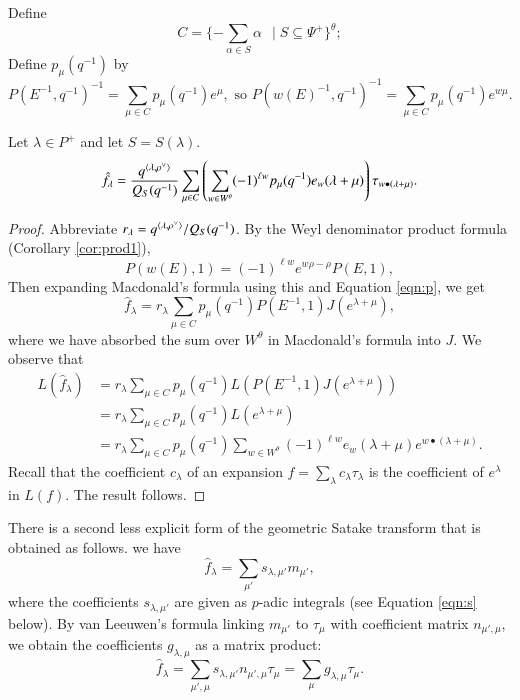 Define
\[
C = \{  - \sum_{\alpha\in S}\alpha \ \ \mid S \subseteq \Psi^+ \}^\theta;
\]
Define $p_\mu(q^{-1})$ by
\begin{equation}\label{eqn:p}
 P(E^{-1},q^{-1})^{-1} = \sum_{\mu\in C} p_\mu(q^{-1}) e^{\mu},
\text{\ \ so }  P(w(E)^{-1},q^{-1})^{-1} 
= \sum_{\mu\in C} p_\mu(q^{-1}) e^{w\mu}.
\end{equation}

\begin{theorem}  Let $\lambda\in P^+$ and let $S=S(\lambda)$.
\[
\hat f_\lambda = \frac{q^{\langle{\lambda,\rho^\vee}\rangle}}{Q_S(q^{-1})} 
\sum_{\mu\in C}\left(\sum_{w\in W^\theta} 
(-1)^{\ell w} p_{\mu}(q^{-1}) e_w(\lambda+\mu)\right)  
\tau_{w\bullet(\lambda+\mu)}.
\]
\end{theorem}

\begin{proof}
  Abbreviate $r_\lambda = q^{\langle{\lambda,\rho^\vee}\rangle}/Q_S(q^{-1})$.
  By the Weyl denominator product formula (Corollary \ref{cor:prod1}),
\begin{equation}
P(w(E),1) = (-1)^{\ell w} e^{w\rho - \rho} P(E,1),
\end{equation}
Then expanding Macdonald's formula using this and Equation
\ref{eqn:p}, we get
\[
\hat f_\lambda = r_\lambda \sum_{\mu\in C} p_\mu(q^{-1}) P(E^{-1},1) J (e^{\lambda+\mu}),
\]
where we have absorbed the sum over $W^\theta$ in Macdonald's formula
into $J$.  We observe that
\begin{align*}
L(\hat f_\lambda) &= r_\lambda \sum_{\mu\in C} p_\mu(q^{-1}) L(P(E^{-1},1) J(e^{\lambda+\mu})) \\
&= 
r_\lambda \sum_{\mu\in C} p_\mu(q^{-1}) L(e^{\lambda+\mu}) \\
&= 
r_\lambda
\sum_{\mu\in C} p_\mu(q^{-1}) \sum_{w\in W^\theta} (-1)^{\ell w} e_w(\lambda+\mu) e^{w\bullet (\lambda+\mu)}.
\end{align*}
Recall that the coefficient $c_\lambda$ of an expansion $f =
\sum_\lambda c_\lambda\tau_\lambda$ is the coefficient of $e^\lambda$
in $L(f)$.  The result follows.
\end{proof}

There is a second less explicit form of the geometric Satake transform
that is obtained as follows.  we have
\[
\hat f_\lambda = \sum_{\mu'} s_{\lambda,\mu'} m_{\mu'},
\]
where the coefficients $s_{\lambda,\mu'}$ are given as $p$-adic
integrals (see Equation \ref{eqn:s} below).  By van Leeuwen's formula
linking $m_{\mu'}$ to $\tau_\mu$ with coefficient matrix
$n_{\mu',\mu}$, we obtain the coefficients $g_{\lambda,\mu}$ as a
matrix product:
\begin{equation}
\hat f_\lambda = \sum_{\mu',\mu} s_{\lambda,\mu'} n_{\mu',\mu} \tau_{\mu} = \sum_{\mu} g_{\lambda,\mu} \tau_\mu.
\end{equation}

